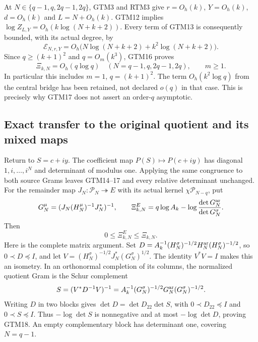 \documentclass[11pt,a4paper]{article}
\begin{document}
At $N\in\{q-1,q,2q-1,2q\}$, GTM3 and RTM3 give
$r=O_h(k)$, $Y=O_h(k)$, $d=O_h(k)$ and $L=N+O_h(k)$.
GTM12 implies $\log Z_{L,Y}=O_h(k\log(N+k+2))$.
Every term of GTM13 is consequently bounded, with its actual degree,
by
\[
 \mathcal E_{N,r,Y}
 =O_h\bigl(N\log(N+k+2)+k^2\log(N+k+2)\bigr).
\]
Since $q\ge(k+1)^2$ and $q=O_m(k^3)$, GTM16 proves
\begin{equation}\tag{GTM17}
 \boxed{\Xi_{k,N}=O_h(q\log q)
       \quad(N=q-1,q,2q-1,2q),\qquad m\ge1.}
\end{equation}
In particular this includes $m=1$, $q=(k+1)^2$.
The term $O_h(k^2\log q)$ from the central bridge has been retained,
not declared $o(q)$ in that case.  This is precisely why GTM17 does
not assert an order-$q$ asymptotic.

\subsection{Exact transfer to the original quotient and its mixed maps}

Return to $S=c+iy$.  The coefficient map
$P(S)\mapsto P(c+iy)$ has diagonal $1,i,\ldots,i^N$ and
determinant of modulus one.  Applying the same congruence to both
source Grams leaves GTM14--17 and every relative determinant unchanged.
For the remainder map $J_N:\mathcal P_N\twoheadrightarrow E$
with its actual kernel $\chi\mathcal P_{N-q}$, put
\[
 G_N^\mu=(J_N(H_N^\mu)^{-1}J_N^*)^{-1},\qquad
 \Xi_{k,N}^{E}=q\log A_k-\log\frac{\det G_N^{\rm ar}}{\det G_N^\sigma}.
\]
Then
\begin{equation}\tag{GTM18}
 0\le\Xi_{k,N}^{E}\le\Xi_{k,N}.
\end{equation}
Here is the complete matrix argument.  Set
$D=A_k^{-1}(H_N^\sigma)^{-1/2}H_N^{\rm ar}(H_N^\sigma)^{-1/2}$,
so $0\prec D\preceq I$, and let
$V=(H_N^\sigma)^{-1/2}J_N^*(G_N^\sigma)^{1/2}$.
The identity $V^*V=I$ makes this an isometry.
In an orthonormal completion of its columns, the normalized quotient
Gram is the Schur complement
\[
 S=(V^*D^{-1}V)^{-1}
  =A_k^{-1}(G_N^\sigma)^{-1/2}G_N^{\rm ar}(G_N^\sigma)^{-1/2}.
\]
Writing $D$ in two blocks gives $\det D=\det D_{22}\det S$,
with $0\prec D_{22}\preceq I$ and $0\prec S\preceq I$.
Thus $-\log\det S$ is nonnegative and at most
$-\log\det D$, proving GTM18.  An empty complementary block
has determinant one, covering $N=q-1$.
\end{document}

